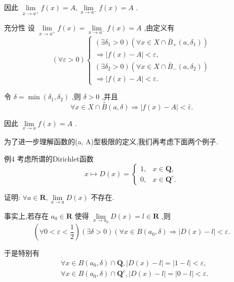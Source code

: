 因此 $\mathop{\lim }\limits_{{x \rightarrow  {a}^{ + }}}f\left( x\right)  = A,\mathop{\lim }\limits_{{x \rightarrow  {a}^{ - }}}f\left( x\right)  = A$ .

充分性 设 $\mathop{\lim }\limits_{{x \rightarrow  {a}^{ + }}}f\left( x\right)  = \mathop{\lim }\limits_{{x \rightarrow  {a}^{ - }}}f\left( x\right)  = A$ ,由定义有
$$\left( {\forall \varepsilon  > 0}\right) \left\{  \begin{array}{l} \left( {\exists {\delta }_{1} > 0}\right) \left( {\forall x \in  X \cap  {\bar{B}}_{ + }\left( {a,{\delta }_{1}}\right) }\right) \\   \Rightarrow  \left| {f\left( x\right)  - A}\right|  < \varepsilon , \\  \left( {\exists {\delta }_{2} > 0}\right) \left( {\forall x \in  X \cap  {\bar{B}}_{ - }\left( {a,{\delta }_{2}}\right) }\right) \\   \Rightarrow  \left| {f\left( x\right)  - A}\right|  < \varepsilon . \end{array}\right.$$

令 $\delta  = \min \left( {{\delta }_{1},{\delta }_{2}}\right)$ ,则 $\delta  > 0$ ,并且
$$\forall x \in  X \cap  \overset{ \circ  }{B}\left( {a,\delta }\right)  \Rightarrow  \left| {f\left( x\right)  - A}\right|  < \bar{\varepsilon }.$$

因此 $\mathop{\lim }\limits_{{x \rightarrow  a}}f\left( x\right)  = A$ .

为了进一步理解函数的(a, A)型极限的定义,我们再考虑下面两个例子.

例4 考虑所谓的Dirichlet函数
$$x \mapsto  D\left( x\right)  = \left\{  \begin{array}{ll} 1, & x \in  \mathbf{Q}, \\  0, & x \in  {\mathbf{Q}}^{c}. \end{array}\right.$$

证明: $\forall a \in  \mathbf{R},\mathop{\lim }\limits_{{x \rightarrow  a}}D\left( x\right)$ 不存在.

事实上,若存在 ${a}_{0} \in  \mathbf{R}$ 使得 $\mathop{\lim }\limits_{{x \rightarrow  {a}_{0}}}D\left( x\right)  = l \in  \mathbf{R}$ ,则
$$\left( {\forall 0 < \varepsilon  < \frac{1}{2}}\right) \left( {\exists \delta  > 0}\right) \left( {\forall x \in  B\left( {{a}_{0},\delta }\right)  \Rightarrow  \left| {D\left( x\right)  - l}\right|  < \varepsilon .}\right.$$

于是特别有
\begin{align*}
	&\forall x \in  B\left( {{a}_{0},\delta }\right)  \cap  \mathbf{Q},\left| {D\left( x\right)  - l}\right|  = \left| {1 - l}\right|  < \varepsilon ,\\
	&\forall x \in  B\left( {{a}_{0},\delta }\right)  \cap  {\mathbf{Q}}^{c},\left| {D\left( x\right)  - l}\right|  = \left| {0 - l}\right|  < \varepsilon .
\end{align*}

